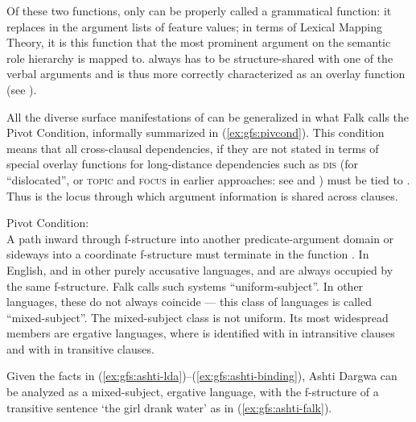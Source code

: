 \documentclass[output=paper]{../langscibook}
\begin{document}
 \noindent Of these two functions, only \GFHAT can be properly called a grammatical function: it replaces \SUBJ in the argument lists of \PRED feature values; in terms of Lexical Mapping Theory, it is this function that the most prominent argument on the semantic role hierarchy is mapped to. \PIVOT always has to be structure-shared with one of the verbal arguments and is thus more correctly characterized as an overlay function (see ).
 
 \newpage
 All the diverse surface manifestations of \PIVOT can be generalized in what Falk calls the Pivot Condition, informally summarized in (\ref{ex:gfs:pivcond}). This condition means that all cross-clausal dependencies, if they are not stated in terms of special overlay functions for long-distance dependencies such as \textsc{dis} (for ``dislocated'', or \textsc{topic} and \textsc{focus} in earlier approaches: see  and ) must be tied to \PIVOT. Thus \PIVOT is the locus through which argument information is shared across clauses.
 
 \ea\label{ex:gfs:pivcond}
 Pivot Condition:\\
 A path inward through f-structure into another predicate-argument domain or sideways into a coordinate f-structure must terminate in the function \PIVOT. \citep[78]{falk06}
 \z
In English, and in other purely accusative languages, \GFHAT and \PIVOT are always occupied by the same f-structure. Falk calls such systems ``uniform-subject''. In other languages, these do not always coincide --- this class of languages is called ``mixed-subject''. The mixed-subject class is not uniform. Its most widespread members are ergative languages, where \PIVOT is identified with \GFHAT in intransitive clauses and with \OBJ in transitive clauses.
 
 Given the facts in (\ref{ex:gfs:ashti-lda})--(\ref{ex:gfs:ashti-binding}), Ashti Dargwa can be analyzed as a mixed-subject, ergative language, with the f-structure of a transitive sentence `the girl drank water' as in (\ref{ex:gfs:ashti-falk}).
 
 
\end{document}

